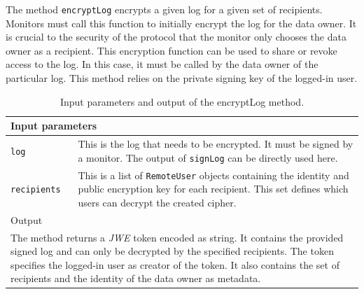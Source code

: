 \documentclass[../main.tex]{subfiles}
\begin{document}
The method \verb|encryptLog| encrypts a given log for a given set of recipients.
Monitors must call this function to initially encrypt the log for the data owner.
It is crucial to the security of the protocol that the monitor only chooses the data owner as a recipient. 
This encryption function can be used to share or revoke access to the log.
In this case, it must be called by the data owner of the particular log. 
This method relies on the private signing key of the logged-in user.
\begin{table}[ht]
    \centering
    \begin{tabular}{|p{3cm}p{10cm}|}
        \hline
        \multicolumn{2}{|l|}{Input parameters}    \\ \hline
        \verb|log|              & This is the log that needs to be encrypted. It must be signed by a monitor. The output of \verb|signLog| can be directly used here.           \\
        \verb|recipients|       & This is a list of \verb|RemoteUser| objects containing the identity and public encryption key for each recipient. This set defines which users can decrypt the created cipher.           \\ \hline
        \multicolumn{2}{|l|}{Output}   \\ \hline
        \multicolumn{2}{|p{13cm}|}{The method returns a \emph{JWE} token encoded as string. It contains the provided signed log and can only be decrypted by the specified recipients. The token specifies the logged-in user as creator of the token. It also contains the set of recipients and the identity of the data owner as metadata.} \\ \hline
    \end{tabular}
    \caption[Signature of encryptLog]{Input parameters and output of the encryptLog method.}
\end{table}
\end{document}

